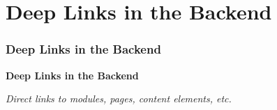 %

\section{Deep Links in the Backend}
\begin{frame}[fragile]
	\frametitle{Deep Links in the Backend}

	\begin{center}\huge{\color{typo3darkgrey}\textbf{Deep Links in the Backend}}\end{center}
	\begin{center}\large{\textit{Direct links to modules, pages, content elements, etc.}}\end{center}

\end{frame}


